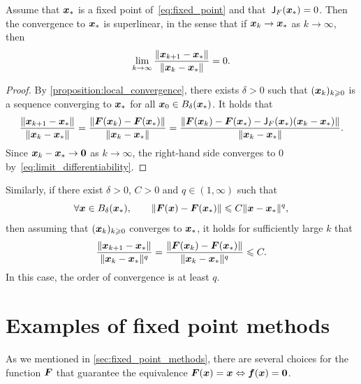 \begin{proposition}
    \label{proposition:superlinear_convergence}
    Assume that $\mathbf{\boldsymbol{x}}_*$ is a fixed point of~\eqref{eq:fixed_point} and that~$\mathsf J_F(\mathbf{\boldsymbol{x}}_*) = 0$.
    Then the convergence to $\mathbf{\boldsymbol{x}}_*$ is superlinear,
    in the sense that if $\mathbf{\boldsymbol{x}}_k \to \mathbf{\boldsymbol{x}}_*$ as $k \to \infty$,
    then
    \[
        \lim_{k \to \infty} \frac{\lVert\mathbf{\boldsymbol{x}}_{k+1} - \mathbf{\boldsymbol{x}}_*\rVert}{\lVert\mathbf{\boldsymbol{x}}_k - \mathbf{\boldsymbol{x}}_*\rVert} = 0.
    \]
\end{proposition}
\begin{proof}
    By \cref{proposition:local_convergence},
    there exists $\delta > 0$ such that $(\mathbf{\boldsymbol{x}}_k)_{k\geqslant 0}$ is a sequence converging to $\mathbf{\boldsymbol{x}}_*$ for all $\mathbf{\boldsymbol{x}}_0 \in B_{\delta}(\mathbf{\boldsymbol{x}}_*)$.
    It holds that
    \[
        \frac{\lVert\mathbf{\boldsymbol{x}}_{k+1} - \mathbf{\boldsymbol{x}}_*\rVert}{\lVert\mathbf{\boldsymbol{x}}_k - \mathbf{\boldsymbol{x}}_*\rVert}
        = \frac{\lVert\mathbf{\boldsymbol{F}}(\mathbf{\boldsymbol{x}}_{k}) - \mathbf{\boldsymbol{F}}(\mathbf{\boldsymbol{x}}_*)\rVert}{\lVert\mathbf{\boldsymbol{x}}_k - \mathbf{\boldsymbol{x}}_*\rVert}
        =  \frac{\lVert\mathbf{\boldsymbol{F}}(\mathbf{\boldsymbol{x}}_{k}) - \mathbf{\boldsymbol{F}}(\mathbf{\boldsymbol{x}}_*) - \mathsf J_F(\mathbf{\boldsymbol{x}}_*) (\mathbf{\boldsymbol{x}}_k - \mathbf{\boldsymbol{x}}_*)\rVert}{\lVert\mathbf{\boldsymbol{x}}_k - \mathbf{\boldsymbol{x}}_*\rVert}.
    \]
    Since $\mathbf{\boldsymbol{x}}_k - \mathbf{\boldsymbol{x}}_* \to \mathbf{\boldsymbol{0}}$ as $k \to \infty$,
    the right-hand side converges to 0 by~\eqref{eq:limit_differentiability}.
\end{proof}

Similarly, if there exist $\delta > 0$, $C > 0$ and $q \in (1, \infty)$ such that
\begin{equation}
    \label{eq:condition_quadratic_convergence}
    \forall \vect x \in B_{\delta}(\vect x_*), \qquad
    \norm{\vect F(\vect x) - \vect F(\vect x_*)} \leq C \norm{\vect x - \vect x_*}^q,
\end{equation}
then assuming that $(\mathbf{\boldsymbol{x}}_k)_{k\geqslant0}$ converges to $\mathbf{\boldsymbol{x}}_*$,
it holds for sufficiently large $k$ that
\[
    \frac{\lVert\mathbf{\boldsymbol{x}}_{k+1} - \mathbf{\boldsymbol{x}}_*\rVert}{\lVert\mathbf{\boldsymbol{x}}_k - \mathbf{\boldsymbol{x}}_*\rVert^q}
    = \frac{\lVert\mathbf{\boldsymbol{F}}(\mathbf{\boldsymbol{x}}_{k}) - \mathbf{\boldsymbol{F}}(\mathbf{\boldsymbol{x}}_*)\rVert}{\lVert\mathbf{\boldsymbol{x}}_k - \mathbf{\boldsymbol{x}}_*\rVert^q}
    \leqslant C.
\]
In this case, the order of convergence is at least $q$.

\section{Examples of fixed point methods}
\label{sec:examples_of_fixed_point_methods}
As we mentioned in \cref{sec:fixed_point_methods},
there are several choices for the function $\mathbf{\boldsymbol{F}}$ that guarantee
the equivalence $\mathbf{\boldsymbol{F}}(\mathbf{\boldsymbol{x}}) = \mathbf{\boldsymbol{x}} \Leftrightarrow \mathbf{\boldsymbol{f}}(\mathbf{\boldsymbol{x}}) = \mathbf{\boldsymbol{0}}$.

